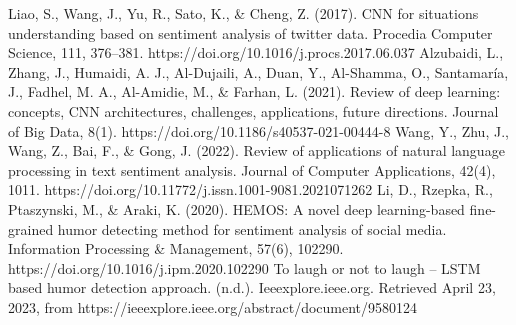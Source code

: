 \documentclass[a4paper]{article}
\begin{document}
\begin{thebibliography}{}
    Liao, S., Wang, J., Yu, R., Sato, K., \& Cheng, Z. (2017). CNN for situations understanding based on sentiment analysis of twitter data. Procedia Computer Science, 111, 376–381. https://doi.org/10.1016/j.procs.2017.06.037
    Alzubaidi, L., Zhang, J., Humaidi, A. J., Al-Dujaili, A., Duan, Y., Al-Shamma, O., Santamaría, J., Fadhel, M. A., Al-Amidie, M., \& Farhan, L. (2021). Review of deep learning: concepts, CNN architectures, challenges, applications, future directions. Journal of Big Data, 8(1). https://doi.org/10.1186/s40537-021-00444-8
    Wang, Y., Zhu, J., Wang, Z., Bai, F., \& Gong, J. (2022). Review of applications of natural language processing in text sentiment analysis. Journal of Computer Applications, 42(4), 1011. https://doi.org/10.11772/j.issn.1001-9081.2021071262
    Li, D., Rzepka, R., Ptaszynski, M., \& Araki, K. (2020). HEMOS: A novel deep learning-based fine-grained humor detecting method for sentiment analysis of social media. Information Processing \& Management, 57(6), 102290. https://doi.org/10.1016/j.ipm.2020.102290
    To laugh or not to laugh – LSTM based humor detection approach. (n.d.). Ieeexplore.ieee.org. Retrieved April 23, 2023, from https://ieeexplore.ieee.org/abstract/document/9580124
\end{thebibliography}
\end{document}
